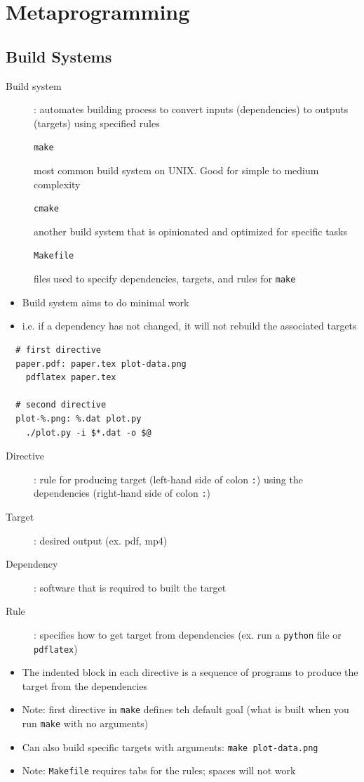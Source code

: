\documentclass[letterpaper,12pt]{article}
\newcommand*{\lstitem}[1]{
  \setbox0\hbox{\lstinline{#1}}
  \item[\usebox0]
}
\begin{document}
\section{Metaprogramming}

\subsection{Build Systems}

\begin{description}
 \item[Build system]: automates building process to convert inputs (dependencies) to outputs (targets) using specified rules
       \lstitem{make} most common build system on UNIX. Good for simple to medium complexity
       \lstitem{cmake} another build system that is opinionated and optimized for specific tasks
       \lstitem{Makefile} files used to specify dependencies, targets, and rules for \lstinline{make}
\end{description}

\begin{itemize}
 \item Build system aims to do minimal work
 \item i.e. if a dependency has not changed, it will not rebuild the associated targets
\end{itemize}

\begin{lstlisting}
  # first directive
  paper.pdf: paper.tex plot-data.png
    pdflatex paper.tex

  # second directive
  plot-%.png: %.dat plot.py
    ./plot.py -i $*.dat -o $@
\end{lstlisting}

\begin{description}
 \item[Directive]: rule for producing target (left-hand side of colon \lstinline{:})  using the dependencies (right-hand side of colon \lstinline{:})
 \item[Target]: desired output (ex. pdf, mp4)
 \item[Dependency]: software that is required to built the target
 \item[Rule]: specifies how to get target from dependencies (ex. run a \lstinline{python} file or \lstinline{pdflatex})
\end{description}

\begin{itemize}
 \item The indented block in each directive is a sequence of programs to produce the target from the dependencies
 \item Note: first directive in \lstinline{make} defines teh default goal (what is built when you run \lstinline{make} with no arguments)
 \item Can also build specific targets with arguments: \lstinline{make plot-data.png}
 \item Note: \lstinline{Makefile} requires tabs for the rules; spaces will not work
\end{itemize}
\end{document}
